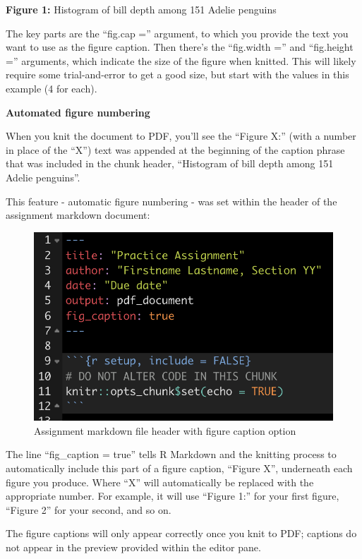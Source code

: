 \documentclass[
]{book}
\begin{document}
\textbf{Figure 1:} Histogram of bill depth among 151 Adelie penguins

The key parts are the ``fig.cap ='' argument, to which you provide the text you want to use as the figure caption. Then there's the ``fig.width ='' and ``fig.height ='' arguments, which indicate the size of the figure when knitted. This will likely require some trial-and-error to get a good size, but start with the values in this example (4 for each).

\textbf{Automated figure numbering}

When you knit the document to PDF, you'll see the ``Figure X:'' (with a number in place of the ``X'') text was appended at the beginning of the caption phrase that was included in the chunk header, ``Histogram of bill depth among 151 Adelie penguins''.

This feature - automatic figure numbering - was set within the header of the assignment markdown document:

\begin{figure}
\includegraphics[width=11.67in]{./more/assign_header} \caption{Assignment markdown file header with figure caption option}\label{fig:unnamed-chunk-15}
\end{figure}

The line ``fig\_caption = true'' tells R Markdown and the knitting process to automatically include this part of a figure caption, ``Figure X'', underneath each figure you produce. Where ``X'' will automatically be replaced with the appropriate number. For example, it will use ``Figure 1:'' for your first figure, ``Figure 2'' for your second, and so on.

The figure captions will only appear correctly once you knit to PDF; captions do not appear in the preview provided within the editor pane.
\end{document}
